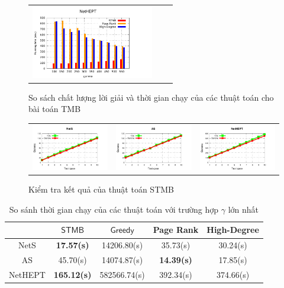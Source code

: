 \begin{figure}[H]
\begin{tabular}{lll}
	\includegraphics[height = 3.2cm]{picture/TimeNetHEPT}
\end{tabular}
\caption{So sách chất lượng lời giải và thời gian chạy của các thuật toán cho bài toán TMB}
\label{solSTMB}    
\end{figure}
\begin{figure}[H]
\begin{tabular}{ccc}
	\includegraphics[height = 3.2 cm]{picture/CheckNetS} &
	\includegraphics[height = 3.2 cm]{picture/CheckAS} &   
	\includegraphics[height = 3.2 cm]{picture/CheckNetHEPT}
\end{tabular}
\caption{Kiểm tra kết quả của thuật toán STMB}
\label{check}    
\end{figure}
\begin{table}[h]
\label{tab:time}       %
\begin{center}
	\begin{tabular}{|c|c|c|c|c|}				
		\hline 
		\textbf{} & {$\mathsf{STMB}$} & {$\mathsf{Greedy}$} & {Page Rank} & {High-Degree} 				
		\\ 
		\hline 
		NetS & \textbf{17.57(s)} &	14206.80(s) &	35.73(s) &	30.24(s)
		\\ 
		\hline 
		AS & 45.70(s) & 14074.87(s) & \textbf{14.39(s)} &	17.85(s)
		\\
		\hline 
		NetHEPT & \textbf{165.12(s)} & 582566.74(s) & 392.34(s) & 374.66(s)
		\\
		\hline 
	\end{tabular}
\end{center}
\caption{So sánh thời gian chạy của các thuật toán với trường hợp $\gamma$ lớn nhất}
\label{timeSTMB}
\end{table}
